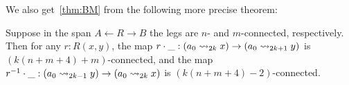 \documentclass[10pt,oneside,leqno,openright]{memoir}
\newcommand*{\sto}{\rightsquigarrow}
\begin{document}
We also get~\cref{thm:BM} from the following more precise theorem:

\begin{theorem}
  Suppose in the span $A \leftarrow R\to B$ the legs are $n$- and $m$-connected,
  respectively.  Then for any $r:R(x,y)$, the map
  $r\cdot\blank : (a_0 \sto_{2k} x) \to (a_0 \sto_{2k+1} y)$ is
  $(k(n+m+4)+m)$-connected, and the map
  $r^{-1}\cdot\blank : (a_0 \sto_{2k-1} y) \to (a_0 \sto_{2k} x)$ is
  $(k(n+m+4)-2)$-connected.
\end{theorem}





\end{document}
